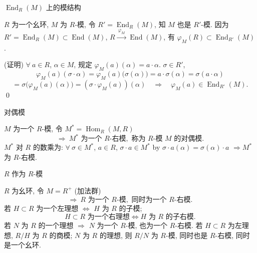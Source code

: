 
\begin{frame}{$\operatorname{End}_R(M)$ 上的模结构}

\begin{eg}
$R$ 为一个幺环, $M$ 为 $R$-模, 令 $R' = \operatorname{End}_R(M)$,
知 $M$ 也是 $R'$-模.
因为 $R' = \operatorname{End}_R(M) \subset \operatorname{End}(M)$,
$R \xrightarrow{\ \varphi_M\ } \operatorname{End}(M)$,
有 $\varphi_M(R) \subset \operatorname{End}_{R'}(M)$.
\end{eg}

\startproof[bg=yellow, fg=red](证明)
$\forall\ a \in R$, $\alpha \in M$, 规定 $\varphi_M(a)(\alpha) = a \cdot \alpha$.
$\sigma \in R'$,
\[
\varphi_M(a)(\sigma \cdot \alpha)
= \varphi_M(a)\big(\sigma(\alpha)\big)
= a \cdot \sigma(\alpha)
= \sigma(a \cdot \alpha)
\]
\[
= \sigma\big(\varphi_M(a)(\alpha)\big)
= (\sigma \cdot \varphi_M(a))(\alpha)
\quad \Longrightarrow \quad \varphi_M(a) \in \operatorname{End}_{R'}(M).
\]
\qed

\end{frame}


\begin{frame}{对偶模}

\begin{eg}[对偶模]
$M$ 为一个 $R$-模, 令 $M^* = \operatorname{Hom}_R(M, R)$
\[
\Longrightarrow\ M^* \text{ 为一个 } R\text{-右模},
\text{ 称为 } R\text{-模 } M \text{ 的对偶模}.
\]
$M^*$ 对 $R$ 的数乘为:
$\forall\ \sigma \in M^*$, $a \in R$, $\sigma \cdot a \in M^*$
by $\sigma \cdot a(\alpha) = \sigma(\alpha) \cdot a$
$\Longrightarrow M^*$ 为 $R$-右模.
\end{eg}

\end{frame}


\begin{frame}{$R$ 作为 $R$-模}

\begin{eg}[$R$ 作为 $R$-模]
$R$ 为幺环, 令 $M = R^+$ (加法群)
\[
\Longrightarrow\ R \text{ 为一个 } R\text{-模}, \text{ 同时为一个 } R\text{-右模}.
\]
若 $H \subset R$ 为一个左理想 $\iff$ $H$ 为 $R$ 的子模;
\[
H \subset R \text{ 为一个右理想} \iff H \text{ 为 } R \text{ 的子右模}.
\]
若 $N$ 为 $R$ 的一个理想 $\Longrightarrow$ $N$ 为一个 $R$-模,
也为一个 $R$-右模.
若 $H \subset R$ 为左理想, $R/H$ 为 $R$ 的商模;
$N$ 为 $R$ 的理想, 则 $R/N$ 为 $R$-模, 同时也是 $R$-右模,
同时是一个幺环.
\end{eg}

\end{frame}



